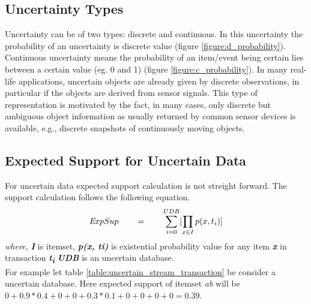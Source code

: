 \subsection{Uncertainty Types}
Uncertainty can be of two types: discrete and continuous. In this uncertainty  the probability of an uncertainty is discrete value (figure \ref{figure:d_probability}). Continuous uncertainty means the probability of an item/event being certain lies between a certain value (eg. 0 and 1) (figure \ref{figure:c_probability}). In many real-life applications, uncertain objects are already given by discrete observations, in particular if the objects are derived from sensor signals. This type of representation is motivated by the fact, in many cases, only discrete but ambiguous object information as usually returned by common sensor devices is available, e.g., discrete snapshots of continuously moving objects.

\subsection{Expected Support for Uncertain Data}
For uncertain data expected support calculation is not streight forward. The support calculation follows the following equation.
	\begin{equation}
	\emph ExpSup \qquad = \qquad \sum_{i = 0}^{UDB} [\prod_{x \in I } p(x , t_i)]
	\end{equation}
\emph {where,}	\textbf{\emph {I}} is itemset,	\textbf{\emph { p(x, ti)}} is existential probability value for any item \textbf{\emph {x}} in transaction \textbf{\emph {t\textsubscript{i}}} 	\textbf{\emph {UDB}} is an uncertain database.\\
For example let table \ref{table:uncertain_stream_transaction} be consider a uncertain database. Here expected support of itemset \emph{ab} will be $0+0.9*0.4+0+0+0.3*0.1+0+0+0+0=0.39$.

